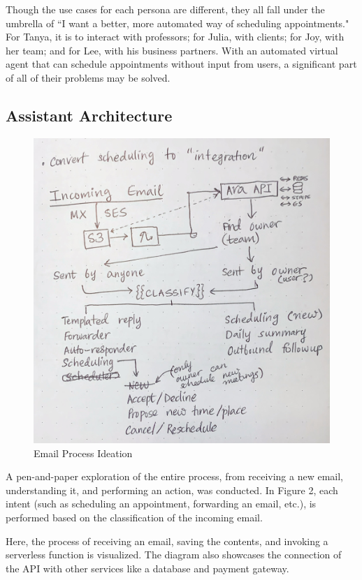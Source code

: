 \documentclass{article}
\begin{document}
Though the use cases for each persona are different, they all fall under the umbrella of ``I want a better, more automated way of scheduling appointments." For Tanya, it is to interact with professors; for Julia, with clients; for Joy, with her team; and for Lee, with his business partners. With an automated virtual agent that can schedule appointments without input from users, a significant part of all of their problems may be solved.

\subsection{Assistant Architecture}

\begin{figure}\centering
	\includegraphics[scale=0.097]{drawing-all-process.jpg}
	\caption{Email Process Ideation}
\end{figure}

A pen-and-paper exploration of the entire process, from receiving a new email, understanding it, and performing an action, was conducted. In Figure 2, each intent (such as scheduling an appointment, forwarding an email, etc.), is performed based on the classification of the incoming email.

Here, the process of receiving an email, saving the contents, and invoking a serverless function is visualized. The diagram also showcases the connection of the API with other services like a database and payment gateway.
\end{document}
